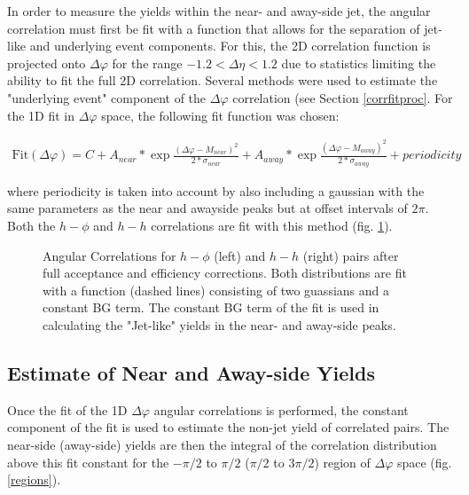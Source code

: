 \documentclass[ALICE,manyauthors]{ALICE_analysis_notes}
\begin{document}
In order to measure the yields within the near- and away-side jet, the angular correlation must first be fit with a function that allows for the separation of jet-like and underlying event components.  For this, the 2D correlation function is projected onto $\Delta\varphi$ for the range $-1.2 < \Delta\eta < 1.2$ due to statistics limiting the ability to fit the full 2D correlation. Several methods were used to estimate the "underlying event" component of the $\Delta\varphi$ correlation (see Section \ref{corrfitproc}. For the 1D fit in $\Delta\varphi$ space, the following fit function was chosen:

\begin{align}
	\text{Fit}(\Delta\varphi) = C + A_{near}*\exp{\frac{(\Delta\varphi - M_{near})^2}{2*\sigma_{near}}} + A_{away}*\exp{\frac{(\Delta\varphi - M_{away})^2}{2*\sigma_{away}}} + \textit{periodicity}
\end{align}

where periodicity is taken into account by also including a gaussian with the same parameters as the near and awayside peaks but at offset intervals of $2\pi$. Both the $h-\phi$ and $h-h$ correlations are fit with this method (fig. \ref{dphi}).
\begin{figure}[ht]
\begin{subfigure}{
\texttt{[image: images/dphi\_hPhi\_0\_20.pdf]}}
\end{subfigure}
\begin{subfigure}{
\texttt{[image: images/dphi\_hh\_0\_20.pdf]}}
\end{subfigure}
\caption{Angular Correlations for $h-\phi$ (left) and $h-h$ (right) pairs after full acceptance and efficiency corrections.  Both distributions are fit with a function (dashed lines) consisting of two guassians and a constant BG term. The constant BG term of the fit is used in calculating the "Jet-like" yields in the near- and away-side peaks.}
\label{dphi}
\end{figure}
\subsection{Estimate of Near and Away-side Yields}

Once the fit of the 1D $\Delta\varphi$ angular correlations is performed, the constant component of the fit is used to estimate the non-jet yield of correlated pairs.  The near-side (away-side) yields are then the integral of the correlation distribution above this fit constant for the $-\pi/2$ to $\pi/2$ ($\pi/2$ to $3\pi/2$) region of $\Delta\varphi$ space (fig. \ref{regions}).
\end{document}
